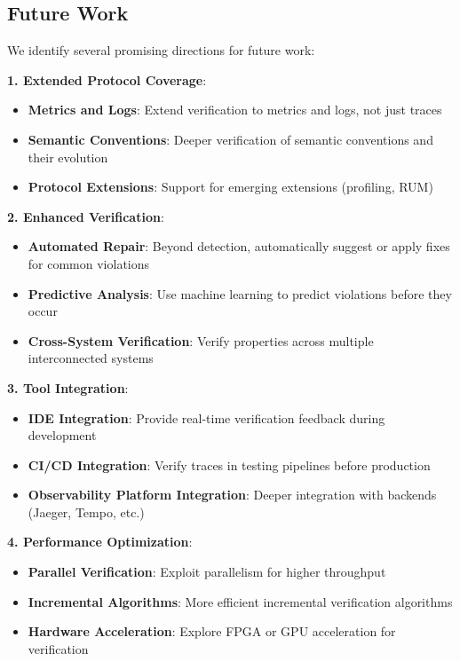 \subsection{Future Work}

We identify several promising directions for future work:

\textbf{1. Extended Protocol Coverage}:
\begin{itemize}
\item \textbf{Metrics and Logs}: Extend verification to \otlp metrics and logs, not just traces
\item \textbf{Semantic Conventions}: Deeper verification of \otlp semantic conventions and their evolution
\item \textbf{Protocol Extensions}: Support for emerging \otlp extensions (profiling, RUM)
\end{itemize}

\textbf{2. Enhanced Verification}:
\begin{itemize}
\item \textbf{Automated Repair}: Beyond detection, automatically suggest or apply fixes for common violations
\item \textbf{Predictive Analysis}: Use machine learning to predict violations before they occur
\item \textbf{Cross-System Verification}: Verify properties across multiple interconnected systems
\end{itemize}

\textbf{3. Tool Integration}:
\begin{itemize}
\item \textbf{IDE Integration}: Provide real-time verification feedback during development
\item \textbf{CI/CD Integration}: Verify traces in testing pipelines before production
\item \textbf{Observability Platform Integration}: Deeper integration with backends (Jaeger, Tempo, etc.)
\end{itemize}

\textbf{4. Performance Optimization}:
\begin{itemize}
\item \textbf{Parallel Verification}: Exploit parallelism for higher throughput
\item \textbf{Incremental Algorithms}: More efficient incremental verification algorithms
\item \textbf{Hardware Acceleration}: Explore FPGA or GPU acceleration for verification
\end{itemize}


